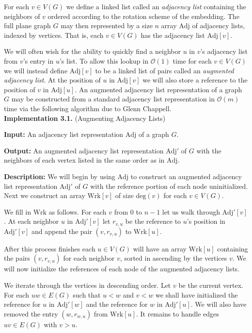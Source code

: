 \documentclass[letterpaper, 12pt]{amsart}
\theoremstyle{definition}
\theoremstyle{definition}
\theoremstyle{thm}
\theoremstyle{definition}
\begin{document}
For each $v\in V(G)$ we define a linked list called an
\emph{adjacency list} containing the neighbors of $v$ ordered according to
the rotation scheme of the embedding. The full plane graph $G$ may then
represented by a size $n$ array $\text{Adj}$ of adjacency lists, indexed by vertices.
That is, each $v\in V(G)$ has the adjacency list $\text{Adj}[v]$.

We will often wish for the ability to quickly find a neighbor $u$
in $v$'s adjacency list from $v$'s entry in $u$'s list. To allow this lookup in
$\mathcal{O}(1)$ time for each $v\in V(G)$ we will instead define $\text{Adj}[v]$
to be a linked list of pairs called an \textit{augmented adjacency list}.
At the position of $u$ in $\text{Adj}[v]$ we will also store a reference to
the position of $v$ in $\text{Adj}[u]$. An augmented adjacency list
representation of a graph $G$ may be constructed from a standard adjacency list
representation in $\mathcal{O}(m)$ time via the following algorithm due to 
Glenn Chappell.\\

\noindent\textbf{Implementation 3.1.} (Augmenting Adjacency Lists)

\noindent\textbf{Input:} An adjacency list representation $\text{Adj}$ of a
graph $G$.

\noindent\textbf{Output:} An augmented adjacency list representation
$\text{Adj}'$ of $G$ with the neighbors of each vertex listed in the same order
as in $\text{Adj}$.

\noindent\textbf{Description:} We will begin by using $\text{Adj}$ to construct
an augmented adjacency list representation $\text{Adj}'$ of $G$ with the
reference portion of each node uninitialized.
Next we construct an array $\text{Wrk}[v]$ of size $\text{deg}(v)$ for each
$v\in V(G)$.

We fill in $\text{Wrk}$ as follows. For each $v$ from $0$ to $n-1$ let us walk
through $\text{Adj}'[v]$. At each neighbor $u$ in $\text{Adj}'[v]$ let
$r_{v,u}$ be the reference to $u$'s position in $\text{Adj}'[v]$ and append the
pair $(v,r_{v,u})$ to $\text{Wrk}[u]$.

After this process finishes each $u\in V(G)$ will have an array $\text{Wrk}[u]$
containing the pairs $(v,r_{v,u})$ for each neighbor $v$, sorted in ascending by
the vertices $v$. We will now initialize the references of each node of the
augmented adjacency lists.

We iterate through the vertices in descending order. Let $v$ be the current
vertex. For each 
$uw\in E(G)$ such that $u<w$ and $v<w$ we shall have initialized the reference
for $u$ in $\text{Adj}'[w]$ and the reference for $w$ in $\text{Adj}'[u]$. We
will also have removed the entry $(w,r_{w,u})$ from $\text{Wrk}[u]$. It remains
to handle edges $uv\in E(G)$ with $v>u$.
\end{document}
